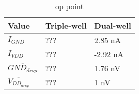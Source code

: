 
\begin{table}[H]
	\label{tab_op}
	\centering
	\begin{tabularx}{\columnwidth}{XXX}
		Value  & Triple-well & Dual-well \\ \hline
		$I_{GND}$                                 & ???          & 2.85 nA      \\
		$I_{VDD}$                                  & ???         & -2.92 nA       \\
		$\overline{GND_{drop}}$      & ???         & 1.76 nV      \\
		$\overline{V_{DD_{drop}}}$  & ???         & 1 nV
	\end{tabularx}
	\caption{op point}
\end{table}
